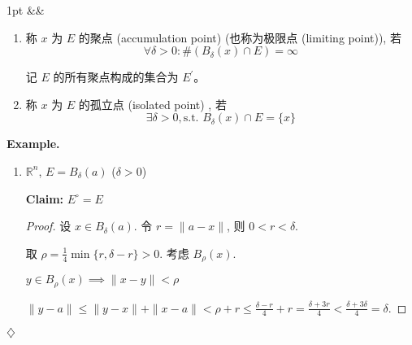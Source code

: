 \documentclass[a4paper]{article}
\newenvironment{formal}[1][]{%
\def\FrameCommand{%
\hspace{1pt}%
{\color{formalline}\vrule width 2pt}%
{\color{formalshade}\vrule width 4pt}%
\colorbox{formalshade}%
}%
\MakeFramed{\advance\hsize-\width\FrameRestore}%
\noindent
\hspace{-4.55pt}%
\begin{adjustwidth}{}{1pt}%
\setlength{\parindent}{0pt}%
\vspace{3pt}%
\ifx&#1&\else %
\textbf{#1}\par
\vspace{1pt}%
\fi }{%
\vspace{2pt}%
\end{adjustwidth}\endMakeFramed%
}
\newenvironment{example}{%
\par
\smallskip
\noindent
\textbf{Example.} }{%
\smallskip
\hfill$\diamondsuit$ \par}
\begin{document}
\begin{formal}
\begin{enumerate}
            \item 称 $x$ 为 $E$ 的聚点 (accumulation point) (也称为极限点 (limiting
                point)), 若
                \[
                    \forall \delta > 0: \#(B_{\delta}(x) \cap E) = \infty
                \]

                记 $E$ 的所有聚点构成的集合为 $E^{\prime}$。

            \item 称 $x$ 为 $E$ 的孤立点 (isolated point) , 若
                \[
                    \exists \delta > 0, \text{s.t. }B_{\delta}(x) \cap E = \{x\}
                \]
        \end{enumerate}
    \end{formal}

    \begin{example}
        \begin{enumerate}
            \item $\mathbb{R}^{n}$, $E = B_{\delta}(a)$ ($\delta > 0$)

                \begin{center}
                \end{center}

                \textbf{Claim:} $E^{\circ}= E$

                \begin{proof}
                    设 $x \in B_{\delta}(a)$. 令 $r = \|a - x\|$, 则 $0 < r < \delta$.

                    取 $\rho = \frac{1}{4}\min\{r, \delta - r\} > 0$. 考虑
                    $B_{\rho}(x)$.

                    $y \in B_{\rho}(x) \implies \|x - y\| < \rho$

                    $\|y - a\| \leq \|y - x\| + \|x - a\| < \rho + r \leq \frac{\delta
                    - r}{4}+ r = \frac{\delta + 3r}{4}< \frac{\delta + 3\delta}{4}
                    = \delta$.


\end{proof}
\end{enumerate}
\end{example}
\end{document}
